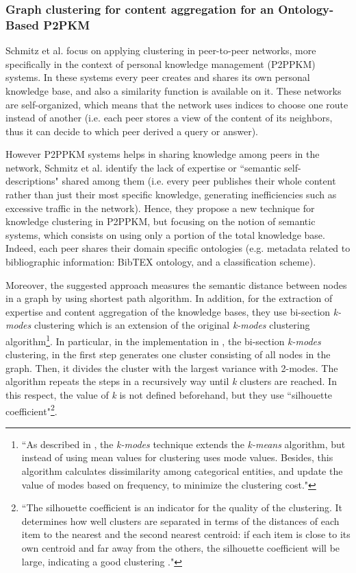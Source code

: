 \documentclass[runningheads]{llncs}
\begin{document}
\subsubsection{Graph clustering for content aggregation for an Ontology-Based P2PKM}\label{content-aggregation}
Schmitz et al. \cite{Schmitz} focus on applying clustering in peer-to-peer networks, more specifically in the context of personal knowledge management (P2PPKM) systems. In these systems every peer creates and shares its own personal knowledge base, and also a similarity function is available on it. These networks are self-organized, which means that the network uses indices to choose one route instead of another (i.e. each peer stores a view of the content of its neighbors, thus it can decide to which peer derived a query or answer).

However P2PPKM systems helps in sharing knowledge among peers in the network, Schmitz et al. \cite{Schmitz} identify the lack of expertise or ``semantic self-descriptions" shared among them (i.e. every peer publishes their whole content rather than just their most specific knowledge, generating inefficiencies such as excessive traffic in the network). Hence, they propose a new technique for knowledge clustering in P2PPKM, but focusing on the notion of semantic systems, which consists on using only a portion of the total knowledge base. Indeed, each peer shares their domain specific ontologies (e.g. metadata related to bibliographic information: BibTEX ontology, and a classification scheme). 

Moreover, the suggested approach measures the semantic distance between nodes in a graph by using shortest path algorithm. In addition, for the extraction of expertise and content aggregation of the knowledge bases, they use bi-section {\textit{k-modes}} clustering which is an extension of the original {\textit{k-modes}} clustering algorithm\footnote{``As described in \cite{Huang}, the {\textit{k-modes}} technique extends the {\textit{k-means}} algorithm, but instead of using mean values for clustering uses mode values. Besides, this algorithm calculates dissimilarity among categorical entities, and update the value of modes based on frequency, to minimize the clustering cost."}. In particular, in the implementation in \cite{Schmitz}, the bi-section {\textit{k-modes}} clustering, in the first step generates one cluster consisting of all nodes in the graph. Then, it divides the cluster with the largest variance with 2-modes. The algorithm repeats the steps in a recursively way until {\textit{k}} clusters are reached. In this respect, the value of {\textit{k}} is not defined beforehand, but they use ``silhouette coefficient"\footnote{``The silhouette coefficient is an indicator for the quality of the clustering. It determines how well clusters are separated in terms of the distances of each item to the nearest and the second nearest centroid: if each item is close to its own centroid and far away from the others, the silhouette coefficient will be large, indicating a good clustering \cite{Schmitz}."}.
\end{document}

